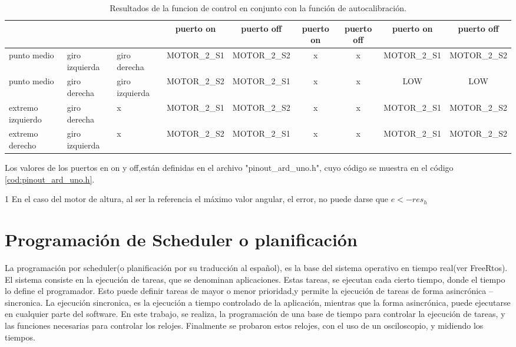 \begin{table}[ht]
{\begin{threeparttable}
\begin{tabular}{|p{1.5cm}|p{1.5cm}|p{1.5cm}|c|c|c|c|c|c|}
		& &  & puerto on & puerto off &puerto on & puerto off&puerto on & puerto off\\ 
		\hline 
		punto medio & giro izquierda & giro derecha &  MOTOR\_2\_S1 &  MOTOR\_2\_S2  & x & x &MOTOR\_2\_S1 &MOTOR\_2\_S2 \\ 
		\hline 
		punto medio & giro derecha & giro izquierda & MOTOR\_2\_S2 & MOTOR\_2\_S1 & x & x & LOW &LOW \\ 
		\hline  
		extremo izquierdo & giro derecha &x & MOTOR\_2\_S1 & MOTOR\_2\_S2  &   x  & x  &MOTOR\_2\_S1 &MOTOR\_2\_S2 \\ 
		\hline 
		extremo derecho & giro izquierda & x & MOTOR\_2\_S2 & MOTOR\_2\_S1  & x  & x  &MOTOR\_2\_S1 &MOTOR\_2\_S2 \\ 
		\hline 
	\end{tabular}
	\begin{tablenotes}
	 	\small 
	 	\item Los valores de los puertos en on y off,están definidas en el archivo "pinout\_ard\_uno.h", cuyo código se muestra en el código  \ref{cod:pinout_ard_uno.h}.
	 	
	 	\item [1] En el caso del motor de altura, al ser la referencia el máximo valor angular, el error, no puede darse que $e < -res_h $  
	\end{tablenotes}
	\end{threeparttable}
}	
	\caption{Resultados de la funcion de control en conjunto con la función de autocalibración.}
	\label{tab:result_control}
\end{table}


\section{Programación de Scheduler o planificación}

La programación por scheduler(o planificación por su traducción al español), es la base del sistema operativo en tiempo real(ver FreeRtos). El sistema consiste en la ejecución de tareas, que se denominan aplicaciones. Estas tareas, se ejecutan cada cierto tiempo, donde el tiempo lo define el programador. Esto puede definir tareas de mayor o menor prioridad,y permite la ejecución de tareas de forma asincrónica – sincronica. La ejecución sincronica, es la ejecución a tiempo controlado de la aplicación, mientras que la forma asincrónica, puede ejecutarse en cualquier parte del software. En este trabajo, se realiza, la programación de una base de tiempo para controlar la ejecución de tareas, y las funciones necesarias para controlar los relojes. Finalmente se probaron estos relojes, con el uso de un osciloscopio, y midiendo los tiempos.

